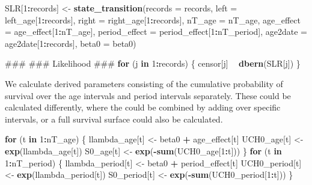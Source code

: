 \documentclass[11pt,]{article}
\newenvironment{Shaded}{\begin{snugshade}}{\end{snugshade}}
\newcommand{\KeywordTok}[1]{\textcolor[rgb]{0.13,0.29,0.53}{\textbf{#1}}}
\newcommand{\DataTypeTok}[1]{\textcolor[rgb]{0.13,0.29,0.53}{#1}}
\newcommand{\DecValTok}[1]{\textcolor[rgb]{0.00,0.00,0.81}{#1}}
\newcommand{\StringTok}[1]{\textcolor[rgb]{0.31,0.60,0.02}{#1}}
\newcommand{\ControlFlowTok}[1]{\textcolor[rgb]{0.13,0.29,0.53}{\textbf{#1}}}
\newcommand{\OperatorTok}[1]{\textcolor[rgb]{0.81,0.36,0.00}{\textbf{#1}}}
\newcommand{\NormalTok}[1]{#1}
\begin{document}
\begin{Shaded}
\begin{Highlighting}[]
\NormalTok{  SLR[}\DecValTok{1}\OperatorTok{:}\NormalTok{records] <-}\StringTok{ }\KeywordTok{state_transition}\NormalTok{(}\DataTypeTok{records =}\NormalTok{ records,}
                                   \DataTypeTok{left =}\NormalTok{ left_age[}\DecValTok{1}\OperatorTok{:}\NormalTok{records],}
                                   \DataTypeTok{right =}\NormalTok{ right_age[}\DecValTok{1}\OperatorTok{:}\NormalTok{records],}
                                   \DataTypeTok{nT_age =}\NormalTok{ nT_age,}
                                   \DataTypeTok{age_effect =}\NormalTok{ age_effect[}\DecValTok{1}\OperatorTok{:}\NormalTok{nT_age],}
                                   \DataTypeTok{period_effect =}\NormalTok{ period_effect[}\DecValTok{1}\OperatorTok{:}\NormalTok{nT_period],}
                                   \DataTypeTok{age2date =}\NormalTok{ age2date[}\DecValTok{1}\OperatorTok{:}\NormalTok{records],}
                                   \DataTypeTok{beta0 =}\NormalTok{ beta0)}

\NormalTok{  ###}
\NormalTok{  ### Likelihood}
\NormalTok{  ###}
  \ControlFlowTok{for}\NormalTok{ (j }\ControlFlowTok{in} \DecValTok{1}\OperatorTok{:}\NormalTok{records) \{}
\NormalTok{    censor[j] }\OperatorTok{~}\StringTok{ }\KeywordTok{dbern}\NormalTok{(SLR[j])}
\NormalTok{  \}}
\end{Highlighting}
\end{Shaded}

We calculate derived parameters consisting of the cumulative probability
of survival over the age intervals and period intervals separately.
These could be calculated differently, where the could be combined by
adding over specific intervals, or a full survival surface could also be
calculated.

\begin{Shaded}
\begin{Highlighting}[]
  \ControlFlowTok{for}\NormalTok{ (t }\ControlFlowTok{in} \DecValTok{1}\OperatorTok{:}\NormalTok{nT_age) \{}
\NormalTok{    llambda_age[t] <-}\StringTok{ }\NormalTok{beta0 }\OperatorTok{+}\StringTok{ }\NormalTok{age_effect[t]}
\NormalTok{    UCH0_age[t] <-}\StringTok{ }\KeywordTok{exp}\NormalTok{(llambda_age[t])}
\NormalTok{    S0_age[t] <-}\StringTok{ }\KeywordTok{exp}\NormalTok{(}\OperatorTok{-}\KeywordTok{sum}\NormalTok{(UCH0_age[}\DecValTok{1}\OperatorTok{:}\NormalTok{t]))}
\NormalTok{  \}}
  \ControlFlowTok{for}\NormalTok{ (t }\ControlFlowTok{in} \DecValTok{1}\OperatorTok{:}\NormalTok{nT_period) \{}
\NormalTok{    llambda_period[t] <-}\StringTok{ }\NormalTok{beta0 }\OperatorTok{+}\StringTok{ }\NormalTok{period_effect[t]}
\NormalTok{    UCH0_period[t] <-}\StringTok{ }\KeywordTok{exp}\NormalTok{(llambda_period[t])}
\NormalTok{    S0_period[t] <-}\StringTok{ }\KeywordTok{exp}\NormalTok{(}\OperatorTok{-}\KeywordTok{sum}\NormalTok{(UCH0_period[}\DecValTok{1}\OperatorTok{:}\NormalTok{t]))}
\NormalTok{  \}}
\end{Highlighting}
\end{Shaded}
\end{document}
